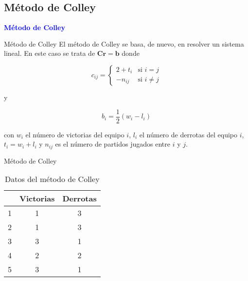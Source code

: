 \documentclass[10pt]{beamer}
\begin{document}
	\subsection{Método de Colley}
	
	\begin{frame}
		\begin{center}
			\Huge\textbf{\textsf{\textcolor{blue}{Método de Colley}}}
		\end{center}
	\end{frame}
	
	\begin{frame}{Método de Colley}
		El método de Colley se basa, de nuevo, en resolver un sistema lineal. En este caso se trata de $\mathbf{Cr} = \mathbf{b}$ donde
		
		\[ c_{ij} = \begin{cases}
		2 + t_i & \text{si } i = j \\
		-n_{ij} & \text{si } i \neq j  
		\end{cases} \]
		
		y 
		
		\[ b_i = \dfrac{1}{2}(w_i - l_i) \]
		
		con $w_i$ el número de victorias del equipo $i$, $l_i$ el número de derrotas del equipo $i$, $t_i = w_i + l_i$ y $n_{ij}$ es el número de partidos jugados entre $i$ y $j$.
	\end{frame}
	
	\begin{frame}{Método de Colley}
		\begin{ejemplo}
			\begin{table}[h]
				\centering
				\caption{Datos del método de Colley}
				\label{tbl:colley}
				\begin{tabular}{@{}ccc@{}}
					\cmidrule(l){2-3}
					& Victorias & Derrotas \\ \midrule
					1 & 1         & 3        \\
					2 & 1         & 3        \\
					3 & 3         & 1        \\
					4 & 2         & 2        \\
					5 & 3         & 1        \\ \bottomrule
				\end{tabular}
			\end{table}
		\end{ejemplo}
			
	\end{frame}
	
\end{document}
